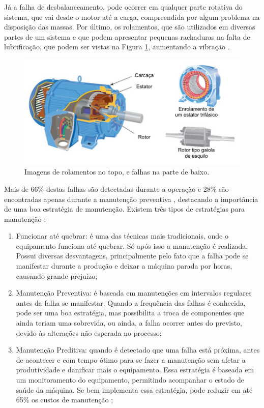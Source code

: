 Já a falha de desbalanceamento, pode ocorrer em qualquer parte rotativa do sistema, que vai desde o motor até a carga, compreendida por
algum problema na disposição das massas. Por último, os rolamentos, que são utilizados em diversas partes de um sistema e que podem
apresentar pequenas rachaduras na falta de lubrificação, que podem ser vistas na Figura \ref{fig:bearing_analog_p3}, aumentando a 
vibração \cite{Sopcik2019}.

\begin{figure}[H]
    \caption{Imagens de rolamentos no topo, e falhas na parte de baixo.}
    \begin{center}
        \includegraphics[scale=0.85, page=4]{referencial/img/imagens_referencial.pdf}
    \end{center}
    \label{fig:bearing_analog_p3}
\end{figure}

Mais de 66\% destas falhas são detectadas durante a operação e 28\% são encontradas apenas durante a manutenção 
preventiva \cite{Gorbounov2018}, destacando a importância de uma boa estratégia de manutenção. Existem três tipos de estratégias 
para manutenção \cite{Wu2013}:  

\begin{enumerate}
    \item Funcionar até quebrar: é uma das técnicas mais tradicionais, onde o equipamento funciona até quebrar. Só após isso a
manutenção é realizada. Possui diversas desvantagens, principalmente pelo fato que a falha pode se manifestar durante a produção e
deixar a máquina parada por horas, causando grande prejuízo;
    \item Manutenção Preventiva: é baseada em manutenções em intervalos regulares antes da falha se manifestar. Quando a frequência das
falhas é conhecida, pode ser uma boa estratégia, mas possibilita a troca de componentes que ainda teriam uma sobrevida, ou ainda, a falha
ocorrer antes do previsto, devido às alterações não esperada no processo;
    \item Manutenção Preditiva: quando é detectado que uma falha está próxima, antes de acontecer e com tempo ótimo para se fazer a 
manutenção sem afetar a produtividade e danificar mais o equipamento. Essa estratégia é baseada em um monitoramento do equipamento,
permitindo acompanhar o estado de saúde da máquina. Se bem implementa essa estratégia, pode reduzir em até 65\% os custos de manutenção
\cite{Wu2013};
\end{enumerate}

